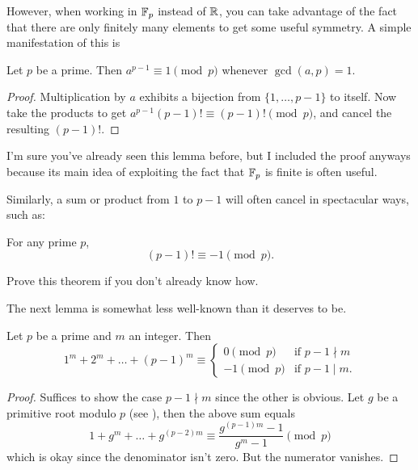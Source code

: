 \documentclass[11pt]{scrartcl}
\begin{document}
However, when working in $\mathbb F_p$ instead of $\mathbb R$, you can take advantage
of the fact that there are only finitely many elements to get some useful symmetry.
A simple manifestation of this is
\begin{lemma}
  Let $p$ be a prime. Then $a^{p-1} \equiv 1 \pmod p$ whenever $\gcd(a,p) = 1$.
\end{lemma}
\begin{proof}
  Multiplication by $a$ exhibits a bijection
  from $\{1, \dots, p-1\}$ to itself.
  Now take the products to get $a^{p-1} (p-1)! \equiv (p-1)! \pmod p$,
  and cancel the resulting $(p-1)!$.
\end{proof}
I'm sure you've already seen this lemma before,
but I included the proof anyways because its main idea of
exploiting the fact that $\mathbb F_p$ is finite is often useful.

Similarly, a sum or product from $1$ to $p-1$ will often cancel in spectacular ways, such as:
\begin{lemma}
  For any prime $p$,
  \[ (p-1)! \equiv -1 \pmod p. \]
\end{lemma}
\begin{exercise}
  Prove this theorem if you don't already know how.
\end{exercise}

The next lemma is somewhat less well-known than it deserves to be.
\begin{lemma}
  \label{lem:powersum_modp}
  Let $p$ be a prime and $m$ an integer.
  Then
  \[ 1^m + 2^m + \dots + (p-1)^m \equiv
    \begin{cases}
      0 \pmod p & \text{if } p-1 \nmid m \\
      -1 \pmod p & \text{if } p-1 \mid m.
    \end{cases} \]
\end{lemma}
\begin{proof}
  Suffices to show the case $p-1 \nmid m$ since the other is obvious.
  Let $g$ be a primitive root modulo $p$ (see \cite{ref:ORPR}),
  then the above sum equals
  \[ 1 + g^m + \dots + g^{(p-2)m}
    \equiv \frac{g^{(p-1)m} - 1}{g^m-1} \pmod p \]
  which is okay since the denominator isn't zero.
  But the numerator vanishes.
\end{proof}
\end{document}
